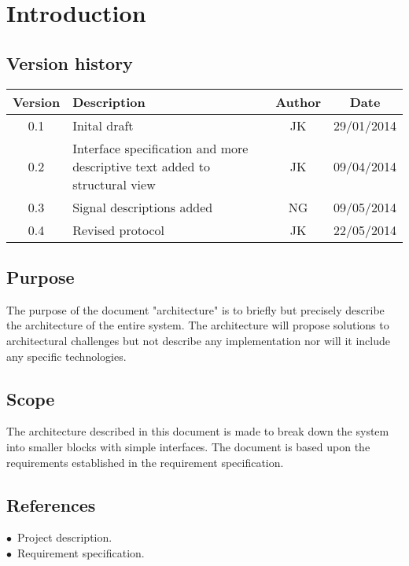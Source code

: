 \chapter{Introduction}
\section{Version history}
\begin{table}[H]
\begin{tabular}{|c|p{9cm}|c|c|}
\hline
Version & Description & Author & Date\\
\hline
0.1 & Inital draft & JK & 29/01/2014\\
\hline
0.2 & Interface specification and more descriptive text added to structural view & JK & 09/04/2014\\ \hline
0.3 & Signal descriptions added & NG & 09/05/2014\\ \hline
0.4 & Revised protocol & JK & 22/05/2014\\ \hline
\end{tabular}
\end{table}

\section{Purpose}
The purpose of the document "architecture" is to briefly but precisely describe the architecture of the entire system. The architecture will propose solutions to architectural challenges but not describe any implementation nor will it include any specific technologies.

\section{Scope}
The architecture described in this document is made to break down the system into smaller blocks with simple interfaces. The document is based upon the requirements established in the requirement specification.

\section{References}
$\bullet$\ Project description.\\
$\bullet$\ Requirement specification.\\



